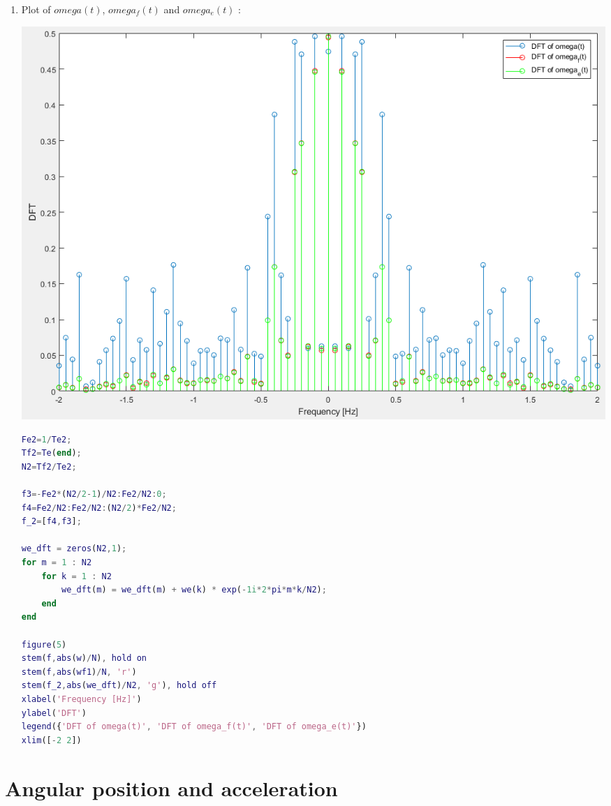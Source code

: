 \documentclass[a4paper,12pt]{article}
\begin{document}
\begin{enumerate}[label={\color{blue}\arabic*)}]
    \item
    Plot of \(omega(t)\), \(omega_f(t)\) and \(omega_e(t)\) :
    \begin{multicols}{2}
        \begin{flushleft}
            \includegraphics[width=1\linewidth]{Images/w_wf_weDFT.png}
            \label{Figure8}
        \end{flushleft}

        \columnbreak

        \begin{lstlisting}[style=Matlab-editor,language=Matlab, basicstyle=\small\ttfamily]
Fe2=1/Te2;
Tf2=Te(end);
N2=Tf2/Te2;

f3=-Fe2*(N2/2-1)/N2:Fe2/N2:0;
f4=Fe2/N2:Fe2/N2:(N2/2)*Fe2/N2;
f_2=[f4,f3];

we_dft = zeros(N2,1);
for m = 1 : N2
    for k = 1 : N2
        we_dft(m) = we_dft(m) + we(k) * exp(-1i*2*pi*m*k/N2);
    end
end

figure(5)
stem(f,abs(w)/N), hold on
stem(f,abs(wf1)/N, 'r')
stem(f_2,abs(we_dft)/N2, 'g'), hold off
xlabel('Frequency [Hz]')
ylabel('DFT')
legend({'DFT of omega(t)', 'DFT of omega_f(t)', 'DFT of omega_e(t)'})
xlim([-2 2])
        \end{lstlisting}
    \end{multicols}

\end{enumerate}

\newpage
\section{Angular position and acceleration}
\end{document}
